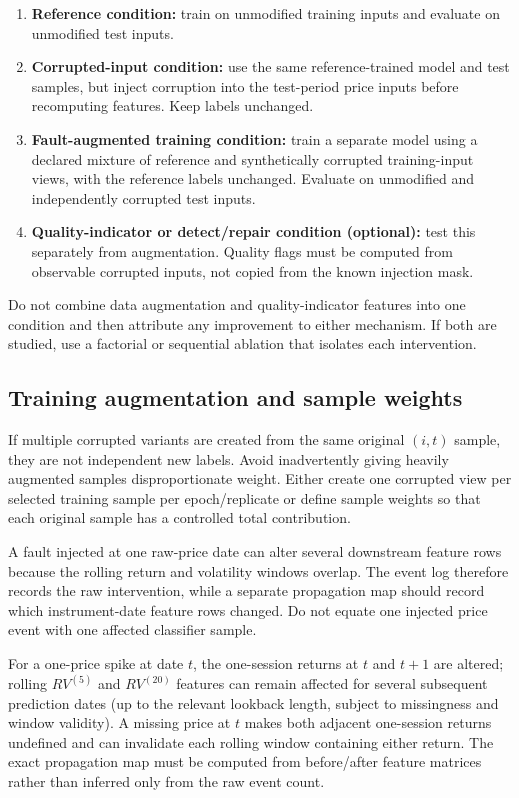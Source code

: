 \documentclass[11pt,a4paper]{article}
\begin{document}
\begin{enumerate}
  \item \textbf{Reference condition:} train on unmodified training inputs and evaluate on unmodified test inputs.
  \item \textbf{Corrupted-input condition:} use the same reference-trained model and test samples, but inject corruption into the test-period price inputs before recomputing features. Keep labels unchanged.
  \item \textbf{Fault-augmented training condition:} train a separate model using a declared mixture of reference and synthetically corrupted training-input views, with the reference labels unchanged. Evaluate on unmodified and independently corrupted test inputs.
  \item \textbf{Quality-indicator or detect/repair condition (optional):} test this separately from augmentation. Quality flags must be computed from observable corrupted inputs, not copied from the known injection mask.
\end{enumerate}

Do not combine data augmentation and quality-indicator features into one condition and then attribute any improvement to either mechanism. If both are studied, use a factorial or sequential ablation that isolates each intervention.

\subsection{Training augmentation and sample weights}

If multiple corrupted variants are created from the same original $(i,t)$ sample, they are not independent new labels. Avoid inadvertently giving heavily augmented samples disproportionate weight. Either create one corrupted view per selected training sample per epoch/replicate or define sample weights so that each original sample has a controlled total contribution.

A fault injected at one raw-price date can alter several downstream feature rows because the rolling return and volatility windows overlap. The event log therefore records the raw intervention, while a separate propagation map should record which instrument-date feature rows changed. Do not equate one injected price event with one affected classifier sample.

For a one-price spike at date $t$, the one-session returns at $t$ and $t+1$ are altered; rolling $RV^{(5)}$ and $RV^{(20)}$ features can remain affected for several subsequent prediction dates (up to the relevant lookback length, subject to missingness and window validity). A missing price at $t$ makes both adjacent one-session returns undefined and can invalidate each rolling window containing either return. The exact propagation map must be computed from before/after feature matrices rather than inferred only from the raw event count.
\end{document}

